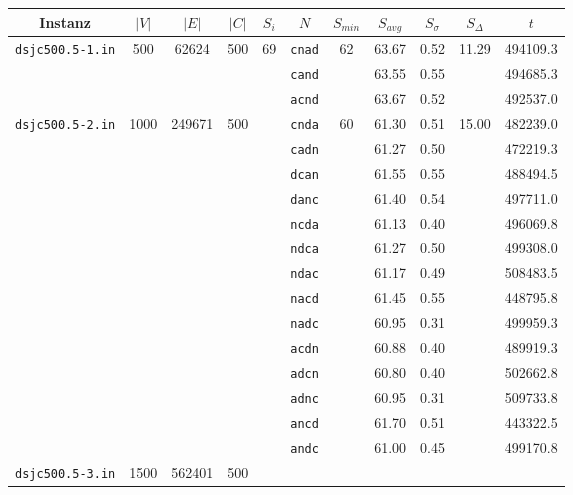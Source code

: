 \begin{table}[p]
\centering
\begin{tabular}{|c|ccc|c|c|ccc|c|c|}
\hline
Instanz & \multicolumn{1}{c}{$|V|$} & \multicolumn{1}{c}{$|E|$} & \multicolumn{1}{c|}{$|C|$} & \multicolumn{1}{c|}{$S_i$} & \multicolumn{1}{c|}{$N$} & $S_{min}$ & \multicolumn{1}{c}{$S_{avg}$} & \multicolumn{1}{c|}{$S_{\sigma}$} & \multicolumn{1}{c|}{$S_{\Delta}$} & \multicolumn{1}{c|}{$t$} \\
\hline\hline

\multirow{3}{*}{\texttt{dsjc500.5-1.in}} & \multirow{3}{*}{500} & \multirow{3}{*}{62624} & \multirow{3}{*}{500} & \multirow{32}{*}{69} &
      \texttt{cnad}	& \multirow{3}{*}{62}	& 63.67	& 0.52	& \multirow{3}{*}{11.29}	& 494109.3\\
&&&&& \texttt{cand}	&			& 63.55	& 0.55	&				& 494685.3\\
&&&&& \texttt{acnd}	&			& 63.67	& 0.52	&				& 492537.0\\
\cline{1-4}\cline{6-11}
\multirow{14}{*}{\texttt{dsjc500.5-2.in}} & \multirow{14}{*}{1000} & \multirow{14}{*}{249671} & \multirow{14}{*}{500} & &
      \texttt{cnda}	& \multirow{14}{*}{60}	& 61.30	& 0.51	& \multirow{14}{*}{15.00}	& 482239.0\\
&&&&& \texttt{cadn}	&			& 61.27	& 0.50	&				& 472219.3\\
&&&&& \texttt{dcan}	&			& 61.55	& 0.55	&				& 488494.5\\
&&&&& \texttt{danc}	&			& 61.40	& 0.54	&				& 497711.0\\
&&&&& \texttt{ncda}	&			& 61.13	& 0.40	&				& 496069.8\\
&&&&& \texttt{ndca}	&			& 61.27	& 0.50	&				& 499308.0\\
&&&&& \texttt{ndac}	&			& 61.17	& 0.49	&				& 508483.5\\
&&&&& \texttt{nacd}	&			& 61.45	& 0.55	&				& 448795.8\\
&&&&& \texttt{nadc}	&			& 60.95	& 0.31	&				& 499959.3\\
&&&&& \texttt{acdn}	&			& 60.88	& 0.40	&				& 489919.3\\
&&&&& \texttt{adcn}	&			& 60.80	& 0.40	&				& 502662.8\\
&&&&& \texttt{adnc}	&			& 60.95	& 0.31	&				& 509733.8\\
&&&&& \texttt{ancd}	&			& 61.70	& 0.51	&				& 443322.5\\
&&&&& \texttt{andc}	&			& 61.00	& 0.45	&				& 499170.8\\
\cline{1-4}\cline{6-11}
\multirow{14}{*}{\texttt{dsjc500.5-3.in}} & \multirow{14}{*}{1500} & \multirow{14}{*}{562401} & \multirow{14}{*}{500} & &

\end{tabular}
\end{table}
